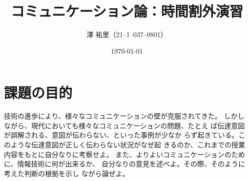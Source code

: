 \documentclass[dvipdfmx]{jsarticle}
\title{コミュニケーション論：時間割外演習}
\author{澤 \/ 祐里（21--1--037--0801）}
\date{\today}
\begin{document}
\maketitle

\section{課題の目的}

技術の進歩により、様々なコミュニケーションの壁が克服されてきた。
しかしながら、現代においても様々なコミュニケーションの問題、たとえ
ば伝達意図が誤解される、意図が伝わらない、といった事例が少なか
らず起きている。このような伝達意図が正しく伝わらない状況がなぜ起
きるのか、これまでの授業内容をもとに自分なりに考察せよ。
また、よりよいコミュニケーションのために、情報技術に何が出来るか、
自分なりの意見を述べよ。その際、そのように考えた判断の根拠を示し
ながら論ぜよ。
\end{document}

